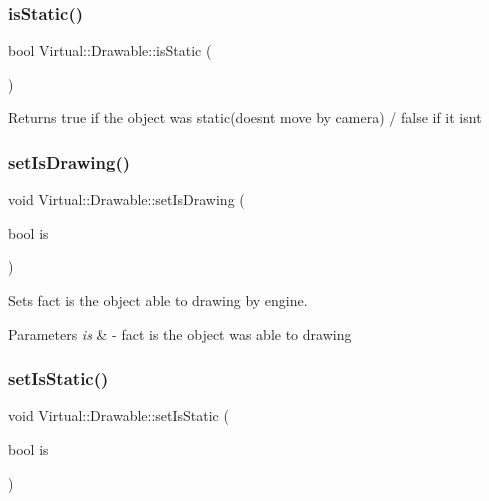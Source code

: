 \subsubsection{\texorpdfstring{is\+Static()}{isStatic()}}
{\footnotesize\ttfamily bool Virtual\+::\+Drawable\+::is\+Static (\begin{DoxyParamCaption}{ }\end{DoxyParamCaption})}

\begin{DoxyReturn}{Returns}
true if the object was static(doesn\textquotesingle{}t move by camera) / false if it isn\textquotesingle{}t 
\end{DoxyReturn}
\hypertarget{class_virtual_1_1_drawable_af47ef44ac82ef8f11873fcf3e7a4aaa0}{}\label{class_virtual_1_1_drawable_af47ef44ac82ef8f11873fcf3e7a4aaa0} 
\subsubsection{\texorpdfstring{set\+Is\+Drawing()}{setIsDrawing()}}
{\footnotesize\ttfamily void Virtual\+::\+Drawable\+::set\+Is\+Drawing (\begin{DoxyParamCaption}\item[{bool}]{is }\end{DoxyParamCaption})}



Sets fact is the object able to drawing by engine. 


\begin{DoxyParams}{Parameters}
{\em is} & -\/ fact is the object was able to drawing \\
\hline
\end{DoxyParams}
\hypertarget{class_virtual_1_1_drawable_a94ed4174ab71aa5aea957d821bc8d170}{}\label{class_virtual_1_1_drawable_a94ed4174ab71aa5aea957d821bc8d170} 
\subsubsection{\texorpdfstring{set\+Is\+Static()}{setIsStatic()}}
{\footnotesize\ttfamily void Virtual\+::\+Drawable\+::set\+Is\+Static (\begin{DoxyParamCaption}\item[{bool}]{is }\end{DoxyParamCaption})}




